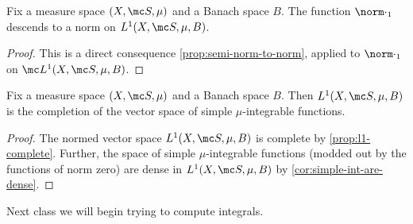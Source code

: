 \documentclass[../notes.tex]{subfiles}
\begin{document}
\begin{lemma}
	Fix a measure space $(X,\mc S,\mu)$ and a Banach space $B$. The function $\norm\cdot_1$ descends to a norm on $L^1(X,\mc S,\mu,B)$.
\end{lemma}
\begin{proof}
	This is a direct consequence \autoref{prop:semi-norm-to-norm}, applied to $\norm\cdot_1$ on $\mc L^1(X,\mc S,\mu,B)$.
\end{proof}
\begin{corollary} \label{cor:l1-complete}
	Fix a measure space $(X,\mc S,\mu)$ and a Banach space $B$. Then $L^1(X,\mc S,\mu,B)$ is the completion of the vector space of simple $\mu$-integrable functions.
\end{corollary}
\begin{proof}
	The normed vector space $L^1(X,\mc S,\mu,B)$ is complete by \autoref{prop:l1-complete}. Further, the space of simple $\mu$-integrable functions (modded out by the functions of norm zero) are dense in $L^1(X,\mc S,\mu,B)$ by \autoref{cor:simple-int-are-dense}.
\end{proof}
Next class we will begin trying to compute integrals.
\end{document}
